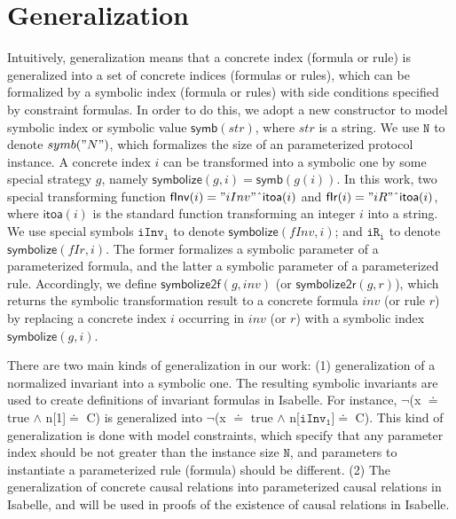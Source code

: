 \documentclass[final]{IEEEtran}
\def \andc {\wedge }
\def \negc {\lnot}
\def \cat {\symbol{94}}
\def \iInv {iInv}
\def \iR {iR}
\newcommand\cai[1]{\textcolor{blue}{ #1} }
\begin{document}
{\section{Generalization}\label{sec:generalization}
Intuitively, generalization means that a concrete index (formula or rule) is generalized into a set of concrete indices (formulas or rules), which can be formalized  by a symbolic index (formula or rules) with side conditions  specified by   constraint formulas.     In order to do this, we  adopt a new constructor  to model symbolic index or symbolic value $\mathsf{symb}(str)$, where $str$ is   a string.  We use $\mathtt{N}$ to denote $symb("N")$, which formalizes the size of an parameterized protocol instance. A concrete index $i$ can be transformed into a symbolic one by some special strategy $g$, namely  $\mathsf{symbolize}(g,i)=\mathsf{symb}(g(i))$. In this work, two special transforming function $\mathsf{fInv}(i)="iInv"\cat \mathsf{itoa}(i)$ and $\mathsf{fIr}(i)="iR"\cat \mathsf{itoa}(i)$, where $\mathsf{itoa}(i)$ is the standard function transforming an integer $i$ into a string. We use  special symbols $\mathtt{\iInv_i}$  to denote $\mathsf{symbolize}(fInv,i)$;  and $\mathtt{\iR_i}$ to denote $\mathsf{symbolize}(fIr,i)$. The former formalizes a symbolic parameter of a parameterized   formula, and the latter    a symbolic  parameter of a parameterized rule. Accordingly, we define $\mathsf{symbolize2f}(g,inv)$ (or  $\mathsf{symbolize2r}(g,r)$), which returns the symbolic transformation result to a concrete formula $inv$ (or rule $r$) by replacing a concrete index $i$ occurring in $inv$ (or $r$) with a symbolic index $\mathsf{symbolize}(g,i)$.


There are two
main kinds of generalization in our work: (1) generalization of a normalized invariant into a symbolic one. %
The resulting symbolic invariants are used to create definitions of invariant formulas in Isabelle. For instance,  $\negc$(x $\doteq$ true $\andc$ n[1]$\doteq$ C) is generalized into $\negc$(x $\doteq$ true $\andc$ n[$\mathtt{\iInv_1}$]$\doteq$ C).  This kind of generalization is done with model constraints, which  specify  that any parameter index should be not greater than the instance size $\mathtt{N}$, and parameters to instantiate a parameterized rule (formula) should be different. (2) The generalization of concrete causal relations into parameterized causal relations in Isabelle, and will be used in proofs of the existence  of causal relations in Isabelle.


}
\end{document}
